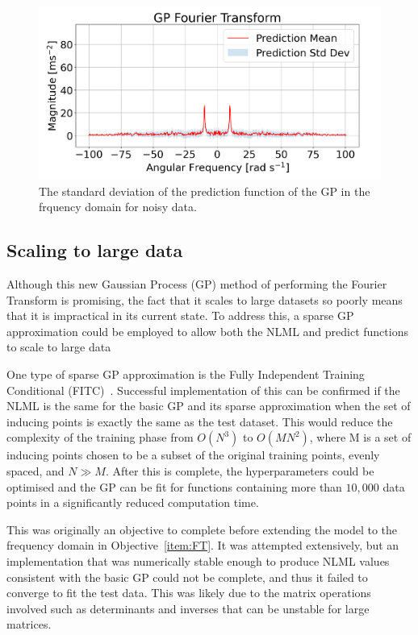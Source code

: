 \documentclass[12pt]{article}
\begin{document}
    \begin{figure}[h]
        \clearpage
        \centering
        \includegraphics[width=1.0\linewidth]{figures/stdv-plot/stdv-plot.png}
        \caption{The standard deviation of the prediction function of the GP in the frquency domain for noisy data.}
        \label{fig:stdv-plot}
    \end{figure}

    \subsection{Scaling to large data}
    Although this new Gaussian Process (GP) method of performing the Fourier Transform is promising, the fact that it scales to large datasets so poorly means that it is impractical in its current state.
    To address this, a sparse GP approximation could be employed to allow both the NLML and predict functions to scale to large data

    One type of sparse GP approximation is the Fully Independent Training Conditional (FITC)~\cite{q-candela}.
    Successful implementation of this can be confirmed if the NLML is the same for the basic GP and its sparse approximation when the set of inducing points is exactly the same as the test dataset.
    This would reduce the complexity of the training phase from $O(N^3)$ to $O(MN^2)$, where M is a set of inducing points chosen to be a subset of the original training points, evenly spaced, and $N \gg M$. 
    After this is complete, the hyperparameters could be optimised and the GP can be fit for functions containing more than $10,000$ data points in a significantly reduced computation time.

     This was originally an objective to complete before extending the model to the frequency domain in Objective~\ref{item:FT}.
    It was attempted extensively, but an implementation that was numerically stable enough to produce NLML values consistent with the basic GP could not be complete, and thus it failed to converge to fit the test data.
    This was likely due to the matrix operations involved such as determinants and inverses that can be unstable for large matrices.
\end{document}
